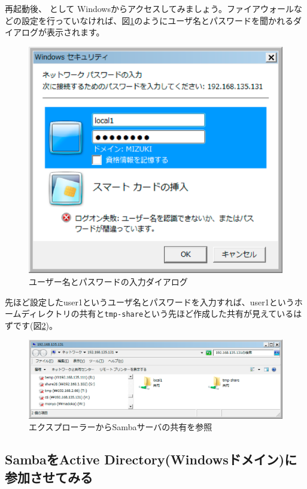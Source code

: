 \documentclass[mingoth,a4paper]{jsarticle}
\begin{document}
再起動後、{\yen}{\yen}{}{}{}{} として Windowsからアクセスしてみましょう。ファイアウォールなどの設定を行っていなければ、図\ref{fig:monyo-samba03.png}のようにユーザ名とパスワードを聞かれるダイアログが表示されます。

\begin{figure}[h]
\begin{center}
 \includegraphics[width=.5\hsize]{image201304/samba/monyo-samba03.eps}
 \caption{ユーザー名とパスワードの入力ダイアログ}
 \label{fig:monyo-samba03.png}
\end{center}
\end{figure}

先ほど設定したuser1というユーザ名とパスワードを入力すれば、user1というホームディレクトリの共有と{\tt{tmp-share}}という先ほど作成した共有が見えているはずです(図\ref{fig:monyo-samba04.png})。

\begin{figure}[h]
\begin{center}
 \includegraphics[width=0.8\hsize]{image201304/samba/monyo-samba04.eps}
 \caption{エクスプローラーからSambaサーバの共有を参照}
 \label{fig:monyo-samba04.png}
\end{center}
\end{figure}

\subsection{SambaをActive Directory(Windowsドメイン)に参加させてみる}
\end{document}
